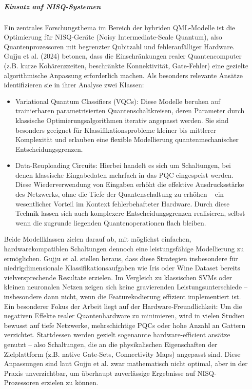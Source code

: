 \subparagraph{Einsatz auf NISQ-Systemen}
Ein zentrales Forschungsthema im Bereich der hybriden QML-Modelle ist die Optimierung für NISQ-Geräte (Noisy Intermediate-Scale Quantum), also Quantenprozessoren mit begrenzter Qubitzahl und fehleranfälliger Hardware. Gujju et al. (2024) betonen, dass die Einschränkungen realer Quantencomputer (z.B. kurze Kohärenzzeiten, beschränkte Konnektivität, Gate-Fehler) eine gezielte algorithmische Anpassung erforderlich machen. Als besonders relevante Ansätze identifizieren sie in ihrer Analyse zwei Klassen:
\begin{itemize}
  \item Variational Quantum Classifiers (VQCs): Diese Modelle beruhen auf trainierbaren parametrisierten Quantenschaltkreisen, deren Parameter durch klassische Optimierungsalgorithmen iterativ angepasst werden. Sie sind besonders geeignet für Klassifikationsprobleme kleiner bis mittlerer Komplexität und erlauben eine flexible Modellierung quantenmechanischer Entscheidungsgrenzen.
  \vspace{0.5em}
  \item Data-Reuploading Circuits: Hierbei handelt es sich um Schaltungen, bei denen klassische Eingabedaten mehrfach in das PQC eingespeist werden. Diese Wiederverwendung von Eingaben erhöht die effektive Ausdrucksstärke des Netzwerks, ohne die Tiefe der Quantenschaltung zu erhöhen – ein wesentlicher Vorteil im Kontext fehlerbehafteter Hardware. Durch diese Technik lassen sich auch komplexere Entscheidungsgrenzen realisieren, selbst wenn die zugrunde liegenden Quantenoperationen flach bleiben.
\end{itemize}
Beide Modellklassen zielen darauf ab, mit möglichst einfachen, hardwarekompatiblen Schaltungen dennoch eine leistungsfähige Modellierung zu ermöglichen. Gujju et al. stellen heraus, dass diese Strategien insbesondere für niedrigdimensionale Klassifikationsaufgaben wie Iris oder Wine Dataset bereits vielversprechende Resultate erzielen. Im Vergleich zu klassischen SVMs oder kleinen neuronalen Netzen zeigen sich keine gravierenden Leistungsunterschiede – insbesondere dann nicht, wenn die Featurekodierung effizient implementiert ist.
Ein besonderer Fokus der Arbeit liegt auf der Hardware-Freundlichkeit: Um die negativen Effekte realer Quantenhardware zu minimieren, wird in vielen Studien bewusst auf tiefe Netzwerke, mehrschichtige PQCs oder hohe Anzahl an Gattern verzichtet. Stattdessen werden gezielt sogenannte hardware-efficient ansätze genutzt – also Schaltungen, die an die physikalischen Eigenschaften der Zielplattform (z.B. native Gate-Sets, Connectivity Maps) angepasst sind. Diese Anpassungen sind laut Gujju et al. zwar mathematisch nicht optimal, aber in der Praxis unverzichtbar, um überhaupt zuverlässige Ergebnisse auf NISQ-Prozessoren erzielen zu können. \cite{gujjuQuantumMachineLearning2024}


